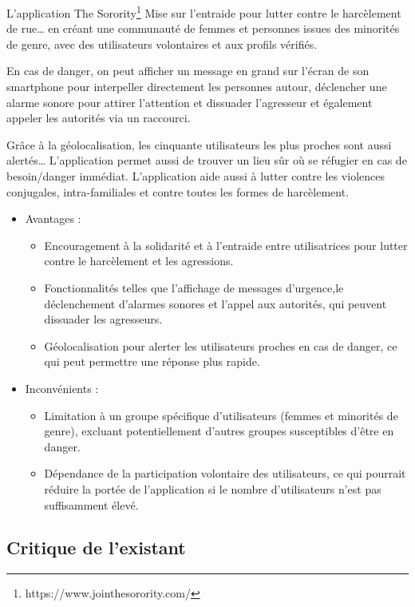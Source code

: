 L’application The Sorority\footnote{https://www.jointhesorority.com/} Mise sur l’entraide pour lutter contre le harcèlement de rue… en créant une communauté de femmes et personnes issues des minorités de genre, avec des utilisateurs volontaires et aux profils vérifiés. 

En cas de danger, on peut afficher un message en grand sur l’écran de son smartphone pour interpeller directement les personnes autour, déclencher une alarme sonore pour attirer l’attention et dissuader l’agresseur et également appeler les autorités via un raccourci.

Grâce à la géolocalisation, les cinquante utilisateurs les plus proches sont aussi alertés… L’application permet aussi de trouver un lieu sûr où se réfugier en cas de besoin/danger immédiat. L’application aide aussi à lutter contre les violences conjugales, intra-familiales et contre toutes les formes de harcèlement.

\begin{itemize}
	\item Avantages :
	\begin{itemize}
		\item Encouragement à la solidarité et à l'entraide entre utilisatrices pour lutter contre le harcèlement et les agressions.
		\item Fonctionnalités telles que l'affichage de messages d'urgence,le déclenchement d'alarmes sonores et l'appel aux autorités, qui peuvent dissuader les agresseurs.
		\item Géolocalisation pour alerter les utilisateurs proches en cas de danger, ce qui peut permettre une réponse plus rapide.
	\end{itemize}
	
	\item Inconvénients :
	\begin{itemize}
		\item Limitation à un groupe spécifique d'utilisateurs (femmes et minorités de genre), excluant potentiellement d'autres groupes susceptibles d'être en danger.
		
		\item Dépendance de la participation volontaire des utilisateurs, ce qui pourrait réduire la portée de l'application si le nombre d'utilisateurs n'est pas suffisamment élevé.
	\end{itemize}
	
\end{itemize}

\subsection{Critique de l’existant}

